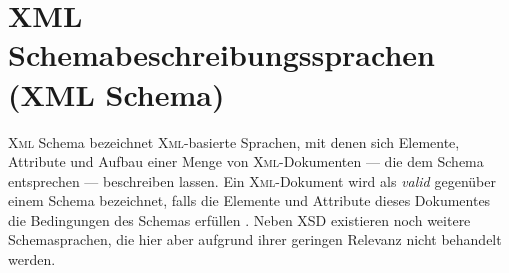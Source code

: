 \section{XML Schemabeschreibungssprachen (XML Schema)}
\label{sec:xmlschema}

\textsc{Xml} Schema bezeichnet \textsc{Xml}-basierte Sprachen, mit denen sich Elemente, Attribute und Aufbau einer Menge von \textsc{Xml}-Dokumenten --- die dem Schema entsprechen --- beschreiben lassen. 
Ein \textsc{Xml}-Dokument wird als \emph{valid} gegenüber einem Schema bezeichnet, falls die Elemente und Attribute dieses Dokumentes die Bedingungen des Schemas erfüllen \cite{taxonomyXMLSchema}.
Neben \gls{XSD} existieren noch weitere Schemasprachen, die hier aber aufgrund ihrer geringen Relevanz nicht behandelt werden. 



%